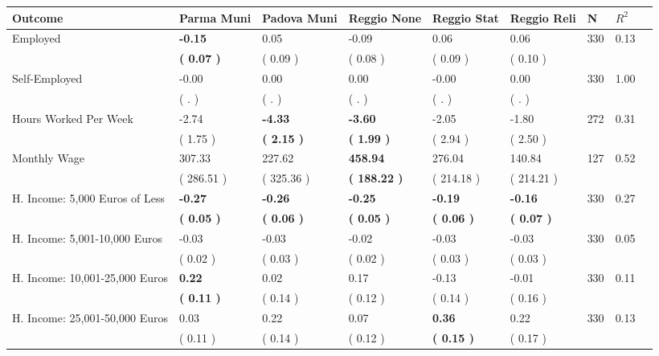 \begin{tabular}{L{6.2cm} C{1.8cm} C{1.8cm} C{1.8cm} C{1.8cm} C{1.8cm} C{1.8cm} C{0.3cm} C{0.3cm}}
\toprule
 \textbf{Outcome} & \textbf{Parma Muni} & \textbf{Padova Muni} & \textbf{Reggio None} & \textbf{Reggio Stat} & \textbf{Reggio Reli} & \textbf{N} & \textbf{$ R^2$} \\
\midrule
Employed & \textbf{    -0.15} &      0.05 &     -0.09 &      0.06 &      0.06  & 330 &       0.13 \\ 
 & \textbf{(     0.07 )} & (     0.09 ) & (     0.08 ) & (     0.09 ) & (     0.10 )  & \\
Self-Employed &     -0.00 &      0.00 &      0.00 &     -0.00 &      0.00  & 330 &       1.00 \\ 
 & (        . ) & (        . ) & (        . ) & (        . ) & (        . )  & \\
Hours Worked Per Week &     -2.74 & \textbf{    -4.33} & \textbf{    -3.60} &     -2.05 &     -1.80  & 272 &       0.31 \\ 
 & (     1.75 ) & \textbf{(     2.15 )} & \textbf{(     1.99 )} & (     2.94 ) & (     2.50 )  & \\
Monthly Wage &    307.33 &    227.62 & \textbf{   458.94} &    276.04 &    140.84  & 127 &       0.52 \\ 
 & (   286.51 ) & (   325.36 ) & \textbf{(   188.22 )} & (   214.18 ) & (   214.21 )  & \\
H. Income: 5,000 Euros of Less & \textbf{    -0.27} & \textbf{    -0.26} & \textbf{    -0.25} & \textbf{    -0.19} & \textbf{    -0.16}  & 330 &       0.27 \\ 
 & \textbf{(     0.05 )} & \textbf{(     0.06 )} & \textbf{(     0.05 )} & \textbf{(     0.06 )} & \textbf{(     0.07 )}  & \\
H. Income: 5,001-10,000 Euros &     -0.03 &     -0.03 &     -0.02 &     -0.03 &     -0.03  & 330 &       0.05 \\ 
 & (     0.02 ) & (     0.03 ) & (     0.02 ) & (     0.03 ) & (     0.03 )  & \\
H. Income: 10,001-25,000 Euros & \textbf{     0.22} &      0.02 &      0.17 &     -0.13 &     -0.01  & 330 &       0.11 \\ 
 & \textbf{(     0.11 )} & (     0.14 ) & (     0.12 ) & (     0.14 ) & (     0.16 )  & \\
H. Income: 25,001-50,000 Euros &      0.03 &      0.22 &      0.07 & \textbf{     0.36} &      0.22  & 330 &       0.13 \\ 
 & (     0.11 ) & (     0.14 ) & (     0.12 ) & \textbf{(     0.15 )} & (     0.17 )  & \\

\end{tabular}

